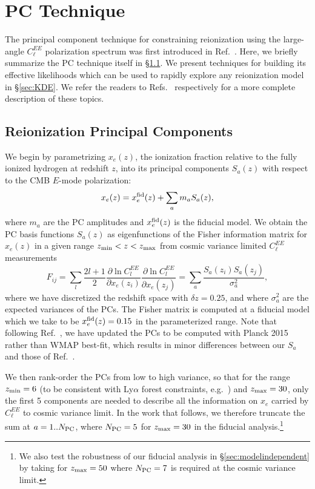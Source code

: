 \documentclass[aps,prd,twocolumn,amsmath,amssymb,showpacs,floatfix,superscriptaddress,nofootinbib]{revtex4-1}
\newcommand{\xef}{x_e^{\rm fid}}
\newcommand{\beq}{\begin{equation}}
\newcommand{\eeq}{\end{equation}}
\begin{document}
%
%
%
%
%

\section{PC Technique}
\label{sec:background}
The principal component technique for constraining reionization using the large-angle $C_\ell^{EE}$ polarization spectrum was first introduced in Ref.~\cite{Hu:2003gh}. Here, we  briefly summarize the PC technique itself in \S\ref{sec:PC}. We present  techniques for building its effective likelihoods which can be used to rapidly explore any reionization model in \S\ref{sec:KDE}. We refer the readers to Refs.~\cite{Mortonson:2007hq,Heinrich:2016ojb} respectively for a more complete description of these topics.

%
%
 
\subsection{Reionization Principal Components}
\label{sec:PC}
We begin by parametrizing $x_e(z)$, the ionization fraction relative to the fully ionized hydrogen at redshift $z$, into its principal components $S_{a}(z)$ with respect to the CMB $E$-mode polarization:
%
\begin{equation}
x_e(z)=\xef(z)+\sum_{a}m_{a}S_{a}(z),
\label{eq:mmutoxe}
\end{equation}
%
where $m_a$ are the PC amplitudes and $\xef(z)$ is the fiducial model. We obtain the PC basis functions $S_{a}(z)$ as eigenfunctions of the Fisher information matrix for $x_e(z)$ in a given range $z_{\rm min}<z<z_{\rm max}$ from cosmic variance limited $C_\ell^{EE}$ measurements 
%
\beq
F_{ij} = \sum_l \frac{2 l+1}{2} \frac{\partial \ln C_l^{EE}}{\partial x_e(z_i)}\frac{\partial \ln C_l^{EE}}{\partial x_e(z_j)} = \sum_a \frac{ S_a(z_i) S_a(z_j)}{\sigma_a^2},
\eeq
%
where we have discretized the redshift space with $\delta z= 0.25$, and where $\sigma_a^2$ are the expected variances of the PCs.
The Fisher matrix is computed at a fiducial model which we take to be $x_e^{\rm fid}(z)=0.15$ in the parameterized range.
 Note that following Ref.~\cite{Heinrich:2018btc}, we have updated the PCs to be computed 
 with Planck 2015 rather than WMAP best-fit,
 which results in minor differences between our $S_a$ and those of  Ref.~\cite{Heinrich:2016ojb}. 


We then rank-order the PCs from low to high variance, so that for the range $z_{\rm min} = 6$ (to be consistent with Ly$\alpha$ forest constraints, e.g.~\cite{Becker:2015lua}) and $z_{\rm max} = 30$, only the first 5 components are needed to describe all the information on $x_e$ carried by $C_\ell^{EE}$ to cosmic variance limit. In the work that follows, we therefore truncate the sum at $a = 1 .. N_{\rm{PC}}$, where $N_{\rm{PC}} = 5$ for $z_{\rm max} = 30$ in the fiducial analysis.\footnote{We also test the robustness of our fiducial analysis in \S \ref{sec:modelindependent} by taking 
 for $z_{\rm max} = 50$ where $N_{\rm{PC}} = 7$ is required at the cosmic variance limit.}   
 
\end{document}

